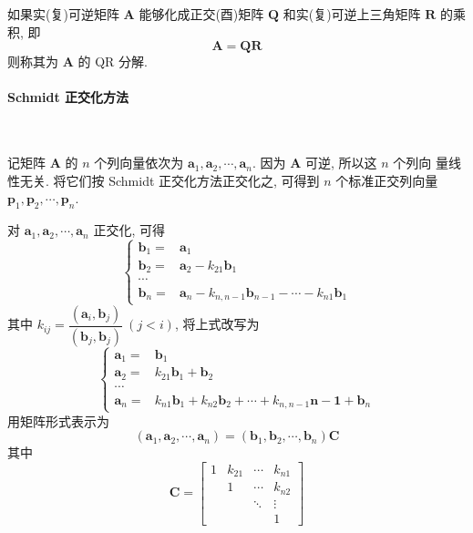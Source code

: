 \par 如果实(复)可逆矩阵 $\bm{A}$ 能够化成正交(酉)矩阵 $\bm{Q}$ 和实(复)可逆上三角矩阵 $\bm{R}$
的乘积, 即
$$
    \bm{A} = \bm{QR}
$$
则称其为 $\bm{A}$ 的 QR 分解.

\paragraph[]{Schmidt 正交化方法} \

\par 记矩阵 $\bm{A}$ 的 $n$ 个列向量依次为 $\bm{a}_1, \bm{a}_2, \cdots, \bm{a}_n$. 因为 $\bm{A}$ 可逆, 所以这 $n$ 个列向
量线性无关. 将它们按 Schmidt 正交化方法正交化之, 可得到 $n$ 个标准正交列向量
$\bm{p}_1,\bm{p}_2, \cdots, \bm{p}_n$.
\par 对 $\bm{a}_1, \bm{a}_2, \cdots, \bm{a}_n$ 正交化, 可得
$$
    \begin{cases}
        \bm{b}_1 = & \bm{a}_1                                                     \\
        \bm{b}_2 = & \bm{a}_2 - k_{21}\bm{b}_1                                    \\
        \cdots                                                                    \\
        \bm{b}_n = & \bm{a}_n - k_{n,n-1}\bm{b}_{n-1} - \cdots - k_{n1}\bm{b}_{1}
    \end{cases}
$$
其中 $k_{ij} = \dfrac{(\bm{a}_i, \bm{b}_j)}{(\bm{b}_j, \bm{b}_j)}\ (j < i)$, 将上式改写为
$$
    \begin{cases}
        \bm{a}_1 = & \bm{b}_1                                                               \\
        \bm{a}_2 = & k_{21}\bm{b}_1 + \bm{b}_2                                              \\
        \cdots                                                                              \\
        \bm{a}_n = & k_{n1}\bm{b}_1 + k_{n2}\bm{b}_2 +\cdots + k_{n,n-1}\bm{n-1} + \bm{b}_n
    \end{cases}
$$
用矩阵形式表示为
$$
    (\bm{a}_1, \bm{a}_2, \cdots, \bm{a}_n) = (\bm{b}_1, \bm{b}_2, \cdots, \bm{b}_n)\bm{C}
$$
其中
$$
    \bm{C} = \begin{bmatrix}
        1 & k_{21} & \cdots & k_{n1} \\
          & 1      & \cdots & k_{n2} \\
          &        & \ddots & \vdots \\
          &        &        & 1
    \end{bmatrix}
$$
